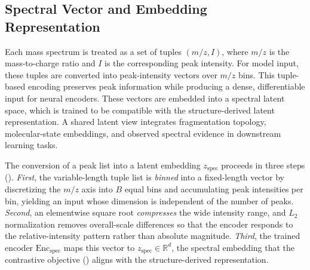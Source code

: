 \subsection{Spectral Vector and Embedding Representation}
\label{sec:spectrumEnc}
Each mass spectrum is treated as a set of tuples $(m/z, I)$, where $m/z$ is the mass-to-charge ratio and $I$ is the corresponding peak intensity.
For model input, these tuples are converted into peak-intensity vectors over $m/z$ bins.
This tuple-based encoding preserves peak information while producing a dense, differentiable input for neural encoders.
These vectors are embedded into a spectral latent space, which is trained to be compatible with the structure-derived latent representation.
A shared latent view integrates fragmentation topology, molecular-state embeddings, and observed spectral evidence in downstream learning tasks.

The conversion of a peak list into a latent embedding $z_{\mathrm{spec}}$ proceeds in three steps ().
\emph{First}, the variable-length tuple list is \emph{binned} into a fixed-length vector by discretizing the $m/z$ axis into $B$ equal bins and accumulating peak intensities per bin, yielding an input whose dimension is independent of the number of peaks.
\emph{Second}, an elementwise square root \emph{compresses} the wide intensity range, and $L_2$ normalization removes overall-scale differences so that the encoder responds to the relative-intensity pattern rather than absolute magnitude.
\emph{Third}, the trained encoder $\mathrm{Enc}_{\mathrm{spec}}$ maps this vector to $z_{\mathrm{spec}} \in \mathbb{R}^{d}$, the spectral embedding that the contrastive objective () aligns with the structure-derived representation.


